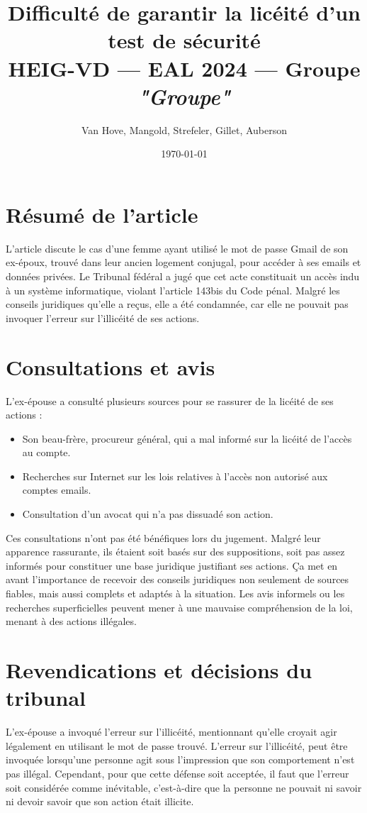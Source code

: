 \documentclass[a4paper]{article}
\title{
    Difficulté de garantir la licéité d'un test de sécurité \\
    \large HEIG-VD --- EAL 2024 --- Groupe \textit{"Groupe"}}
\author{
    Van Hove, Mangold, Strefeler, Gillet, Auberson\\
}
\date{\today}
\begin{document}
\maketitle

\section*{Résumé de l'article}

L'article discute le cas d'une femme ayant utilisé le mot de passe Gmail de son ex-époux, trouvé dans leur ancien logement conjugal, pour accéder à ses emails et données privées. Le Tribunal fédéral a jugé que cet acte constituait un accès indu à un système informatique, violant l'article 143bis du Code pénal. Malgré les conseils juridiques qu'elle a reçus, elle a été condamnée, car elle ne pouvait pas invoquer l'erreur sur l'illicéité de ses actions.

\section*{Consultations et avis}

L'ex-épouse a consulté plusieurs sources pour se rassurer de la licéité de ses actions :
\begin{itemize}
  \item Son beau-frère, procureur général, qui a mal informé sur la licéité de l'accès au compte.
  \item Recherches sur Internet sur les lois relatives à l'accès non autorisé aux comptes emails.
  \item Consultation d'un avocat qui n'a pas dissuadé son action.
\end{itemize}

Ces consultations n'ont pas été bénéfiques lors du jugement. Malgré leur apparence rassurante, ils étaient soit basés sur des suppositions, soit pas assez informés pour constituer une base juridique justifiant ses actions. Ça met en avant l'importance de recevoir des conseils juridiques non seulement de sources fiables, mais aussi complets et adaptés à la situation. Les avis informels ou les recherches superficielles peuvent mener à une mauvaise compréhension de la loi, menant à des actions illégales.


\section*{Revendications et décisions du tribunal}

L'ex-épouse a invoqué l'erreur sur l'illicéité, mentionnant qu'elle croyait agir légalement en utilisant le mot de passe trouvé. L'erreur sur l'illicéité, peut être invoquée lorsqu'une personne agit sous l'impression que son comportement n'est pas illégal. Cependant, pour que cette défense soit acceptée, il faut que l'erreur soit considérée comme inévitable, c'est-à-dire que la personne ne pouvait ni savoir ni devoir savoir que son action était illicite. 
\end{document}
